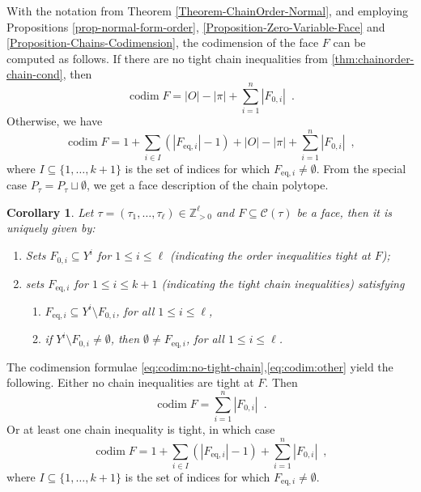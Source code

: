 \documentclass[12pt,a4paper]{amsart}
\newtheorem{corollary}[theorem]{Corollary}
\theoremstyle{definition}
\newcommand{\CP}{\mathcal{C}}
\newcommand{\Z}{\mathbb{Z}}
\DeclareMathOperator{\codim}{codim}
\begin{document}
With the notation from Theorem \ref{Theorem-ChainOrder-Normal}, and employing Propositions \ref{prop-normal-form-order}, \ref{Proposition-Zero-Variable-Face} and \ref{Proposition-Chains-Codimension}, the codimension of the face $F$ can be computed as follows.
If there are no tight chain inequalities from \ref{thm:chainorder-chain-cond}, then
\begin{equation}\label{eq:codim:no-tight-chain}
  \codim F = |O|-|\pi|+\sum\limits_{i=1}^{n}|F_{0,i}| \enspace .
\end{equation}
Otherwise, we have
\begin{equation}\label{eq:codim:other}
  \codim F = 1+\sum\limits_{i\in I}\left(|F_{\mathrm{eq},i}|-1\right)+|O|-|\pi|+\sum\limits_{i=1}^{n}|F_{0,i}| \enspace,
\end{equation}
where $I\subseteq\{1,\dots,k+1\}$ is the set of indices for which $F_{\mathrm{eq},i}\neq\emptyset$.
From the special case $P_{\tau}=P_{\tau}\sqcup\emptyset$, we get a face description of the chain polytope.
\begin{corollary}\label{cor-chain-normal}
Let $\tau=(\tau_1,\dots,\tau_\ell)\in\Z_{> 0}^\ell$ and $F\subseteq\CP(\tau)$ be a face, then it is uniquely given by:
\begin{enumerate}
    \item{
        Sets $F_{0,i}\subseteq Y^i$ for $1\leq i\leq \ell$ (indicating the order inequalities tight at $F$);}
      \item\label{thm:chain-chain-cond}{
          sets $F_{\mathrm{eq},i}$ for $1\leq i\leq k+1$ (indicating the tight chain inequalities) satisfying
          \begin{enumerate}
            \item{
                $F_{\mathrm{eq},i}\subseteq Y^{i}\setminus F_{0,i}$, for all $1\leq i\leq \ell$,
            }
            \item{
                if $Y^{{i}}\setminus F_{0,i}\neq\emptyset$, then $\emptyset\neq F_{\mathrm{eq},i}$, for all $1\leq i\leq \ell$.
            }
        \end{enumerate}
    }
  \end{enumerate}
\end{corollary}

The codimension formulae \eqref{eq:codim:no-tight-chain},\eqref{eq:codim:other} yield the following.
Either no chain inequalities are tight at $F$.
Then
\begin{equation*}
  \codim F = \sum\limits_{i=1}^{n}|F_{0,i}| \enspace .
\end{equation*}
Or at least one chain inequality is tight, in which case
\begin{equation*}
  \codim F = 1+\sum\limits_{i\in I}\left(|F_{\mathrm{eq},i}|-1\right)+\sum\limits_{i=1}^{n}|F_{0,i}| \enspace ,
\end{equation*}
where $I\subseteq\{1,\dots,k+1\}$ is the set of indices for which $F_{\mathrm{eq},i}\neq\emptyset$.
\end{document}
